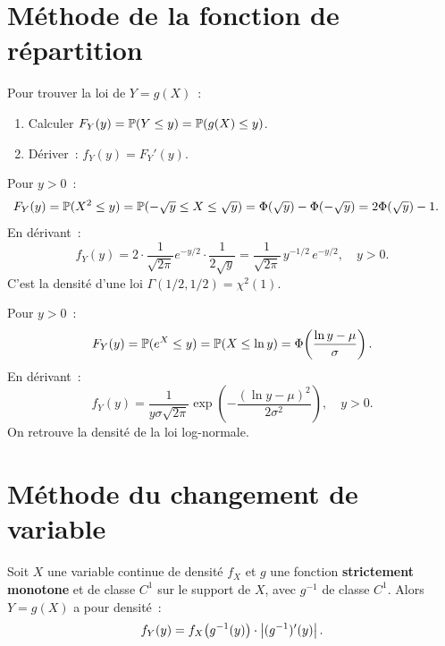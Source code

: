 \section{M\'ethode de la fonction de r\'epartition}

\begin{theoreme}
\label{thm:methode_cdf}
Pour trouver la loi de $Y = g(X)$~:
\begin{enumerate}
    \item Calculer $F_Y(y) = \mathbb{P}(Y \leq y) = \mathbb{P}(g(X) \leq y)$.
    \item D\'eriver~: $f_Y(y) = F_Y'(y)$.
\end{enumerate}
\end{theoreme}

\begin{exemple}[$Y = X^2$ avec $X \sim \mathcal{N}(0,1)$]
Pour $y > 0$~:
\begin{align*}
    F_Y(y) &= \mathbb{P}(X^2 \leq y) = \mathbb{P}(-\sqrt{y} \leq X \leq \sqrt{y})
    = \Phi(\sqrt{y}) - \Phi(-\sqrt{y}) = 2\Phi(\sqrt{y}) - 1.
\end{align*}
En d\'erivant~:
\[
    f_Y(y) = 2 \cdot \frac{1}{\sqrt{2\pi}} e^{-y/2} \cdot \frac{1}{2\sqrt{y}}
    = \frac{1}{\sqrt{2\pi}}\, y^{-1/2}\, e^{-y/2}, \quad y > 0.
\]
C'est la densit\'e d'une loi $\Gamma(1/2, 1/2) = \chi^2(1)$.
\end{exemple}

\begin{exemple}[$Y = e^X$ avec $X \sim \mathcal{N}(\mu, \sigma^2)$]
Pour $y > 0$~:
\[
    F_Y(y) = \mathbb{P}(e^X \leq y) = \mathbb{P}(X \leq \ln y) = \Phi\!\left(\frac{\ln y - \mu}{\sigma}\right).
\]
En d\'erivant~:
\[
    f_Y(y) = \frac{1}{y\sigma\sqrt{2\pi}}
    \exp\!\left(-\frac{(\ln y - \mu)^2}{2\sigma^2}\right), \quad y > 0.
\]
On retrouve la densit\'e de la loi log-normale.
\end{exemple}

\section{M\'ethode du changement de variable}

\begin{theoreme}
\label{thm:changement_var}
Soit $X$ une variable continue de densit\'e $f_X$ et $g$ une fonction
\textbf{strictement monotone} et de classe $C^1$ sur le support de $X$, avec
$g^{-1}$ de classe $C^1$. Alors $Y = g(X)$ a pour densit\'e~:
\[
    f_Y(y) = f_X\bigl(g^{-1}(y)\bigr) \cdot \left| (g^{-1})'(y) \right|.
\]
\end{theoreme}

